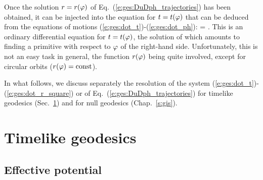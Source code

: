 Once the solution $r=r(\varphi)$ of Eq.~(\ref{e:ges:DuDph_trajectories})
has been obtained, it can be injected into the equation for $t = t(\varphi)$
that can be deduced from the equations of motions (\ref{e:ges:dot_t})-(\ref{e:ges:dot_ph}):
\be
     =   .
\ee
This is an ordinary differential equation for $t=t(\varphi)$, the solution of
which amounts to finding a primitive with respect to $\varphi$ of the
right-hand side. Unfortunately, this is not an easy task in general, the function
$r(\varphi)$ being quite involved, except for circular orbits ($r(\varphi)=\mathrm{const}$).

In what follows, we discuss separately the resolution of
the system (\ref{e:ges:dot_t})-(\ref{e:ges:dot_r_square}) or of
Eq.~(\ref{e:ges:DuDph_trajectories})
for timelike geodesics
(Sec.~\ref{s:ges:timelike}) and for null geodesics (Chap.~\ref{s:gis}).


\section{Timelike geodesics} \label{s:ges:timelike}

\subsection{Effective potential} \label{s:ges:eff_pot_timelike}

